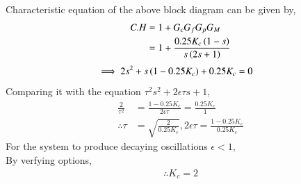\documentclass[journal,12pt,twocolumn]{IEEEtran}
\theoremstyle{remark}
\begin{document}
Characteristic equation of the above block diagram can be given by,
\begin{align}
     C.H &= 1+G_c G_f G_p G_M   \\
     &= 1+\frac{0.25 K_c \left(1-s\right) }{s\left(2s+1\right)} 
\end{align}
\begin{align}
    \implies 2s^2+s\left(1-0.25K_c\right)+0.25K_c&=0  
\end{align}
Comparing it with the equation $\tau ^2s^2+2\epsilon \tau s+1$,
\begin{align}
    \frac{2}{\tau^2}&=\frac{1-0.25K_c}{2\epsilon \tau}=\frac{0.25K_c}{1}    \\
    \therefore \tau&=\sqrt{\frac{2}{0.25K_c}} , 2\epsilon\tau=\frac{1-0.25K_c}{0.25K_c}
\end{align}
For the system to produce decaying oscillations {$\epsilon <1$},    \\
By verfying options,
\begin{align}
    \therefore \boxed{K_c=2}
\end{align}
\end{document}
